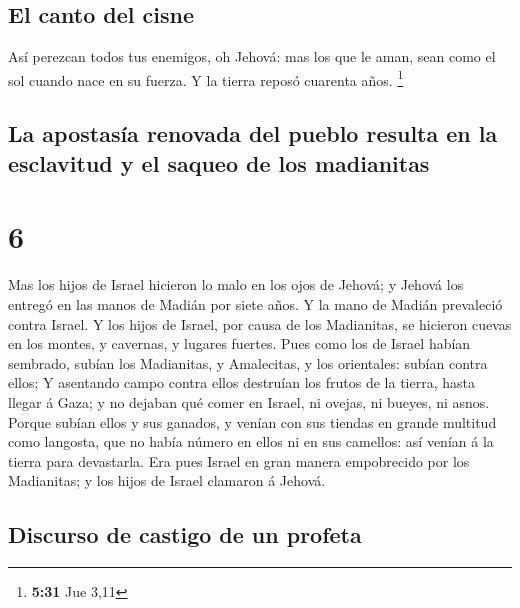 \hypertarget{el-canto-del-cisne}{%
\subsection{El canto del cisne}\label{el-canto-del-cisne}}

 Así perezcan todos tus enemigos, oh Jehová: mas los que
le aman, sean como el sol cuando nace en su fuerza. Y la tierra reposó
cuarenta años. \footnote{\textbf{5:31} Jue 3,11}

\hypertarget{la-apostasuxeda-renovada-del-pueblo-resulta-en-la-esclavitud-y-el-saqueo-de-los-madianitas}{%
\subsection{La apostasía renovada del pueblo resulta en la esclavitud y
el saqueo de los
madianitas}\label{la-apostasuxeda-renovada-del-pueblo-resulta-en-la-esclavitud-y-el-saqueo-de-los-madianitas}}

\hypertarget{section-5}{%
\section{6}\label{section-5}}

 Mas los hijos de Israel hicieron lo malo en los ojos de
Jehová; y Jehová los entregó en las manos de Madián por siete años.
 Y la mano de Madián prevaleció contra Israel. Y los hijos
de Israel, por causa de los Madianitas, se hicieron cuevas en los
montes, y cavernas, y lugares fuertes.  Pues como los de
Israel habían sembrado, subían los Madianitas, y Amalecitas, y los
orientales: subían contra ellos;  Y asentando campo contra
ellos destruían los frutos de la tierra, hasta llegar á Gaza; y no
dejaban qué comer en Israel, ni ovejas, ni bueyes, ni asnos.
 Porque subían ellos y sus ganados, y venían con sus
tiendas en grande multitud como langosta, que no había número en ellos
ni en sus camellos: así venían á la tierra para devastarla.
 Era pues Israel en gran manera empobrecido por los
Madianitas; y los hijos de Israel clamaron á Jehová.

\hypertarget{discurso-de-castigo-de-un-profeta}{%
\subsection{Discurso de castigo de un
profeta}\label{discurso-de-castigo-de-un-profeta}}

